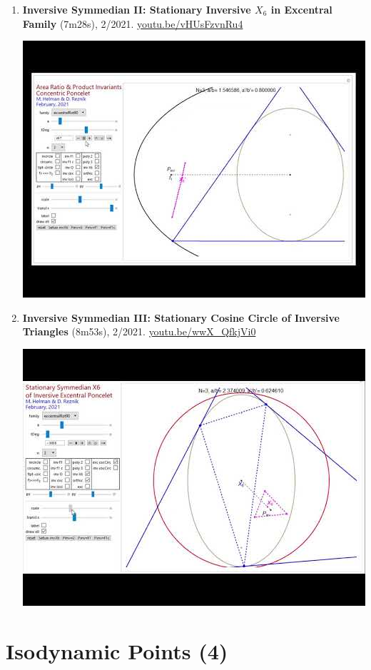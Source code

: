 \documentclass[12pt]{article}
\begin{document}
\begin{enumerate}[resume]
% 
\item \textbf{Inversive Symmedian II: Stationary Inversive $X_{6}$ in Excentral Family} (7m28s), 2/2021. \href{https://youtu.be/vHUsFzvnRu4}{\url{youtu.be/vHUsFzvnRu4}}
\begin{center}\includegraphics[width=.5\textwidth]{pics/vHUsFzvnRu4.jpg}\end{center}
% 
\item \textbf{Inversive Symmedian III: Stationary Cosine Circle of Inversive Triangles} (8m53s), 2/2021. \href{https://youtu.be/wwX_QfkjVi0}{\url{youtu.be/wwX\_QfkjVi0}}
\begin{center}\includegraphics[width=.5\textwidth]{pics/wwX_QfkjVi0.jpg}\end{center}
% 
\end{enumerate}

\section{Isodynamic Points (4)}
\end{document}
